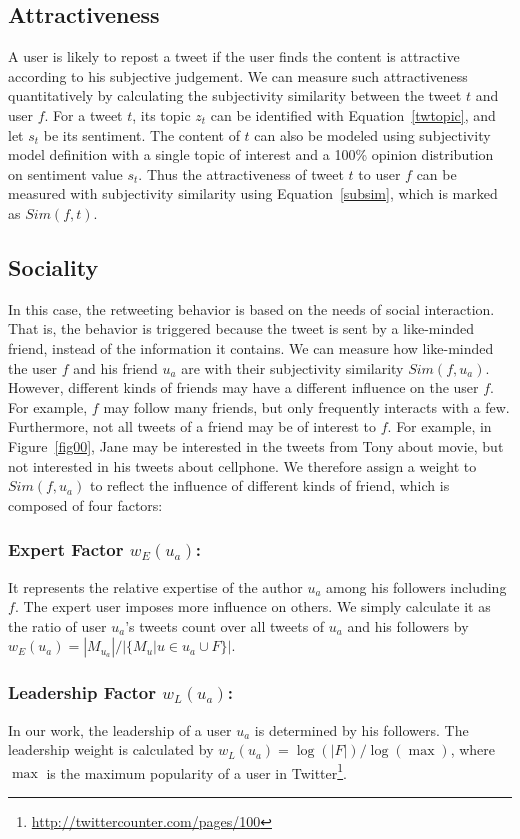 \documentclass[letterpaper]{article}
\begin{document}
\subsection{Attractiveness}

A user is likely to repost a tweet if the user finds the content is attractive according to his subjective judgement. We can measure such attractiveness quantitatively by calculating the subjectivity similarity between the tweet $ t $ and user $ f $. For a tweet $ t $, its topic $ z_t $ can be identified with Equation~\ref{twtopic}, and let $ s_t $ be its sentiment. The content of $ t $ can also be modeled using subjectivity model definition with a single topic of interest and a 100\% opinion distribution on sentiment value $s_t$. Thus the attractiveness of tweet $t$ to user $f$ can be measured with subjectivity similarity using Equation~\ref{subsim}, which is marked as $ Sim(f,t) $.

\subsection{Sociality}

In this case, the retweeting behavior is based on the needs of social interaction. That is, the behavior is triggered because the tweet is sent by a like-minded friend, instead of the information it contains. We can measure how like-minded the user $ f $ and his friend $ u_a $ are with their subjectivity similarity $ Sim(f,u_a) $.  However, different kinds of friends may have a different influence on the user $ f $. For example, $ f $ may follow many friends, but only frequently interacts with a few. Furthermore, not all tweets of a friend may be of interest to $ f $. For example, in Figure~\ref{fig00}, Jane may be interested in the tweets from Tony about movie, but not interested in his tweets about cellphone. We therefore assign a weight to $ Sim(f,u_a) $ to reflect the influence of different kinds of friend, which
is composed of four factors:
\subsubsection{Expert Factor $ w_E(u_a) $:} It represents the relative expertise of the author $ u_a $ among his followers including $ f $. The expert user imposes more influence on others. We simply calculate it as the ratio of user $ u_a $'s tweets count over all tweets of $ u_a $ and his followers by $ w_E(u_a)=|M_{u_a}|/|\{M_u|u \in u_a \cup F \}|  $.
\subsubsection{Leadership Factor $ w_L(u_a) $:} In our work, the leadership of a user $ u_a $ is determined by his followers. The leadership weight is calculated by $ w_L(u_a)=\log (|F|)/\log(\max) $, where $ \max $ is the maximum popularity of a user in Twitter\footnote{\url{http://twittercounter.com/pages/100}}.
\end{document}
